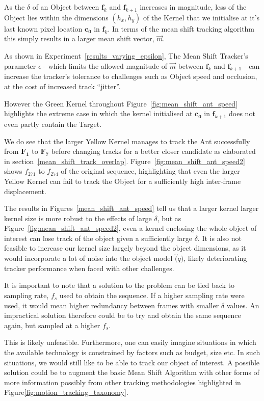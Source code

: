 As the $\delta$ of an Object between $\mathbf{f}_k$ and $\mathbf{f}_{k+1}$ 
increases in magnitude, less of the Object lies within the dimensions
$(h_x,h_y)$ of the Kernel that we initialise at it's last known pixel location
$\mathbf{c_0}$ in $\mathbf{f}_k$. In terms of the mean shift tracking algorithm this simply
results in a larger mean shift vector, $\vec{m}$.

As shown in Experiment~\ref{results_varying_epsilon}, The Mean Shift Tracker's
parameter $\epsilon$ - which limits the allowed magnitude of $\vec{m}$ between
$\mathbf{f}_{k}$ and $\mathbf{f}_{k+1}$ - can increase the tracker's tolerance
to challenges such as Object speed and occlusion, at the
cost of increased track ``jitter''. 

However the Green Kernel throughout Figure~\ref{fig:mean_shift_ant_speed}
highlights the extreme case in which the kernel initialised at $\mathbf{c_0}$ in
$\mathbf{f}_{k+1}$ does not even partly contain the Target.  

We do see that the larger Yellow Kernel manages to track the Ant successfully
from $\mathbf{F_1}$ to $\mathbf{F_7}$ before changing tracks for a better closer
candidate as elaborated in section~\ref{mean_shift_track_overlap}.
Figure~\ref{fig:mean_shift_ant_speed2} shows $f_{271}$ to $f_{274}$ of the original
sequence, highlighting that even the larger Yellow Kernel can fail to track the
Object for a sufficiently high inter-frame displacement.

The results in Figures~\ref{mean_shift_ant_speed} tell us
that a larger kernel larger kernel size is more robust to the effects of large
$\delta$, but as Figure~\ref{fig:mean_shift_ant_speed2}, even a
kernel enclosing the whole object of interest can lose track of the object given
a sufficiently large $\delta$. It is also not feasible to increase our kernel
size largely beyond the object dimensions, as it would incorporate a lot of
noise into the object model $\hat(q)$, likely deteriorating tracker performance
when faced with other challenges.

It is important to note that a solution to the problem can be tied back to
sampling rate, $f_s$ used to obtain the sequence. If a higher sampling rate were
used, it would mean higher redundancy between frames with smaller $\delta$
values. An impractical solution therefore could be to try and obtain the
same sequence again, but sampled at a higher $f_s$.

This is likely unfeasible. Furthermore, one can easily imagine situations in which the
available technology is constrained by factors such as budget, size etc. In such
situations, we would still like to be able to track our object of interest.  A
possible solution could be to augment the basic Mean Shift Algorithm with other
forms of more information possibly from other tracking methodologies highlighted
in Figure\ref{fig:motion_tracking_taxonomy}. 

